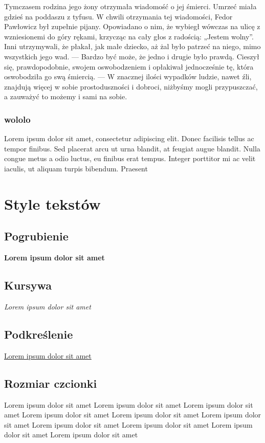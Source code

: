 \documentclass{article}
\begin{document}
Tymczasem rodzina jego żony otrzymała wiadomość o jej śmierci. Umrzeć miała gdzieś na poddaszu z tyfusu. W chwili otrzymania tej wiadomości, Fedor Pawłowicz był zupełnie pijany. Opowiadano o nim, że wybiegł wówczas na ulicę z wzniesionemi do góry rękami, krzycząc na cały głos z radością: „Jestem wolny”. Inni utrzymywali, że płakał, jak małe dziecko, aż żal było patrzeć na niego, mimo wszystkich jego wad. — Bardzo być może, że jedno i drugie było prawdą. Cieszył się, prawdopodobnie, swojem oswobodzeniem i opłakiwał jednocześnie tę, która oswobodziła go swą śmiercią. — W znacznej ilości wypadków ludzie, nawet źli, znajdują więcej w sobie prostoduszności i dobroci, niżbyśmy mogli przypuszczać, a zauważyć to możemy i sami na sobie.

\subsubsection[short]{wololo}

Lorem ipsum dolor sit amet, consectetur adipiscing elit. Donec facilisis tellus ac tempor finibus. Sed placerat arcu ut urna blandit, at feugiat augue blandit. Nulla congue metus a odio luctus, eu finibus erat tempus. Integer porttitor mi ac velit iaculis, ut aliquam turpis bibendum. Praesent

\section{Style tekstów}

\subsection{Pogrubienie}
\textbf{Lorem ipsum dolor sit amet}
\subsection{Kursywa}
\textit{Lorem ipsum dolor sit amet}
\subsection{Podkreślenie}
\underline{Lorem ipsum dolor sit amet}
\subsection{Rozmiar czcionki}
{\tiny Lorem ipsum dolor sit amet}
{\scriptsize Lorem ipsum dolor sit amet}
{\footnotesize Lorem ipsum dolor sit amet}
{\small Lorem ipsum dolor sit amet}
{\normalsize Lorem ipsum dolor sit amet}
{\large Lorem ipsum dolor sit amet}
{\Large Lorem ipsum dolor sit amet}
{\LARGE Lorem ipsum dolor sit amet}
{\huge Lorem ipsum dolor sit amet}
{\Huge Lorem ipsum dolor sit amet}
\end{document}
